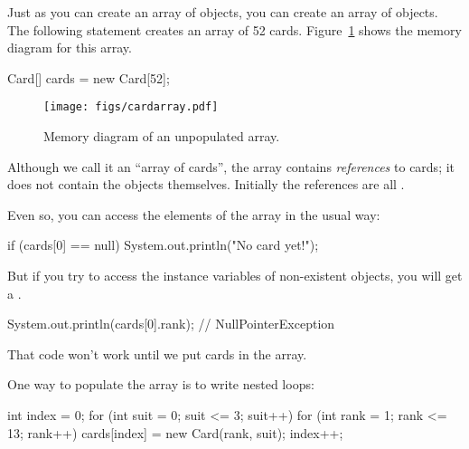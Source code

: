
Just as you can create an array of  objects, you can create an array of  objects.
The following statement creates an array of 52 cards.
Figure~\ref{fig.cardarray} shows the memory diagram for this array.

\begin{code}
Card[] cards = new Card[52];
\end{code}

\begin{figure}[!ht]
\begin{center}
\texttt{[image: figs/cardarray.pdf]}
\caption{Memory diagram of an unpopulated  array.}
\label{fig.cardarray}
\end{center}
\end{figure}



Although we call it an ``array of cards'', the array contains {\em references} to cards; it does not contain the  objects themselves.
Initially the references are all .

Even so, you can access the elements of the array in the usual way:

\begin{code}
if (cards[0] == null) {
    System.out.println("No card yet!");
}
\end{code}


But if you try to access the instance variables of non-existent  objects, you will get a .

\begin{code}
System.out.println(cards[0].rank);  // NullPointerException
\end{code}


That code won't work until we put cards in the array.


One way to populate the array is to write nested  loops:

\begin{code}
int index = 0;
for (int suit = 0; suit <= 3; suit++) {
    for (int rank = 1; rank <= 13; rank++) {
        cards[index] = new Card(rank, suit);
        index++;
    }
}
\end{code}

